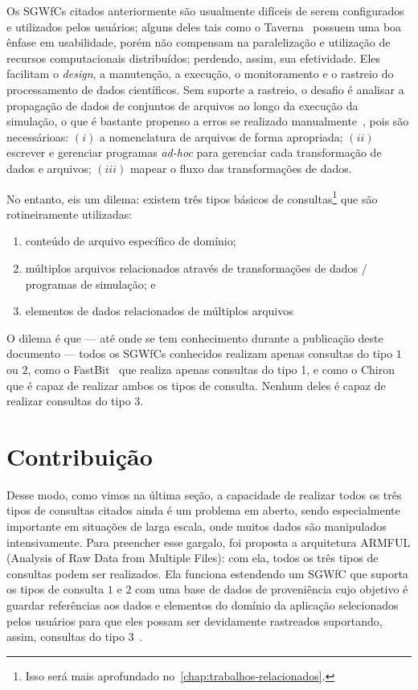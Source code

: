 Os SGWfCs citados anteriormente são usualmente difíceis de serem configurados e utilizados pelos usuários; alguns deles tais como o Taverna~\cite{hull2006taverna} possuem uma boa ênfase em usabilidade, porém não compensam na paralelização e utilização de recursos computacionais distribuídos; perdendo, assim, sua efetividade.
Eles facilitam o \textit{design}, a manutenção, a execução, o monitoramento e o rastreio do processamento de dados científicos. Sem suporte a rastreio, o desafio é analisar a propagação de dados de conjuntos de arquivos ao longo da execução da simulação, o que é bastante propenso a erros se realizado manualmente~\cite{silva2015analyzing}, pois são necessárioas: \( (i) \) a nomenclatura de arquivos de forma apropriada; \( (ii) \) escrever e gerenciar programas \textit{ad-hoc} para gerenciar cada transformação de dados e arquivos; \( (iii) \) mapear o fluxo das transformações de dados.

No entanto, eis um dilema: existem três tipos básicos de consultas\footnote{Isso será mais aprofundado no~\autoref{chap:trabalhos-relacionados}.} que são rotineiramente utilizadas:

\begin{enumerate}
    \item conteúdo de arquivo específico de domínio;
    \item múltiplos arquivos relacionados através de transformações de dados / programas de simulação; e
    \item elementos de dados relacionados de múltiplos arquivos
\end{enumerate}

O dilema é que --- até onde se tem conhecimento durante a publicação deste documento --- todos os SGWfCs conhecidos realizam apenas consultas do tipo \( 1 \) ou \( 2 \), como o FastBit~\cite{wu2009fastbit} que realiza apenas consultas do tipo 1, e como o Chiron~\cite{ogasawara2013chiron} que é capaz de realizar ambos os tipos de consulta. Nenhum deles é capaz de realizar consultas do tipo 3.

\section{Contribuição}

Desse modo, como vimos na última seção, a capacidade de realizar todos os três tipos de consultas citados ainda é um problema em aberto, sendo especialmente importante em situações de larga escala, onde muitos dados são manipulados intensivamente.
Para preencher esse gargalo, foi proposta a arquitetura  ARMFUL (Analysis of Raw Data from Multiple Files)\cite{silva2017raw,silva2016situ}: com ela, todos os três tipos de consultas podem ser realizados. Ela funciona estendendo um SGWfC que suporta os tipos de consulta \( 1 \) e \( 2 \) com uma base de dados de proveniência cujo objetivo é guardar referências aos dados e elementos do domínio da aplicação selecionados pelos usuários para que eles possam ser devidamente rastreados suportando, assim, consultas do tipo 3~\cite{silva2015analyzing}.

